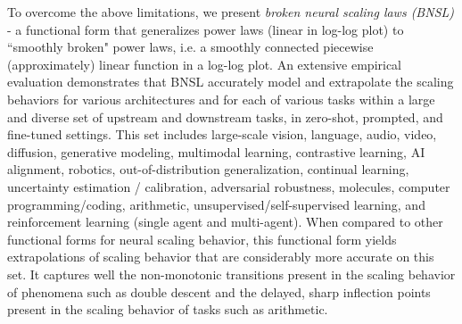 \documentclass{article} %
\begin{document}
To overcome the above limitations,  we present {\it broken neural scaling laws (BNSL)} - a functional form that generalizes power laws (linear in  log-log plot) %
to ``smoothly broken" power laws, i.e. a smoothly connected piecewise (approximately) linear function in a log-log plot.  An extensive empirical evaluation demonstrates that BNSL accurately model and extrapolate the scaling behaviors for various architectures and for each of various tasks within a large and diverse set of upstream and downstream tasks, in zero-shot, prompted, and fine-tuned settings. This set includes large-scale vision, language, audio, video, diffusion, generative modeling, multimodal learning, contrastive learning, AI alignment, robotics, out-of-distribution generalization, continual learning, uncertainty estimation / calibration, adversarial robustness, molecules, computer programming/coding, arithmetic, unsupervised/self-supervised learning, and reinforcement learning (single agent and multi-agent).
When compared to other functional forms for neural scaling behavior, this functional form yields extrapolations of scaling behavior that are considerably more accurate on this set. It captures well the non-monotonic transitions present in the scaling behavior of phenomena such as double descent and the delayed, sharp inflection points present in the scaling behavior of tasks such as arithmetic.


\end{document}
